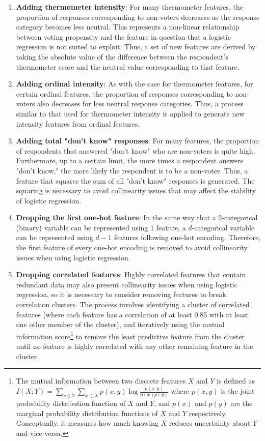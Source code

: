 \documentclass{article}
\begin{document}
	\begin{enumerate}[label=\Alph*.]
		\item {\textbf{Adding thermometer intensity}: For many thermometer features, the proportion of responses corresponding to non-voters decreases as the response category becomes less neutral. This represents a non-linear relationship between voting propensity and the feature in question that a logistic regression is not suited to exploit. Thus, a set of new features are derived by taking the absolute value of the difference between the respondent's thermometer score and the neutral value corresponding to that feature.}
		\item {\textbf{Adding ordinal intensity}}: As with the case for thermometer features, for certain ordinal features, the proportion of responses corresponding to non-voters also decreases for less neutral response categories. Thus, a process similar to that used for thermometer intensity is applied to generate new intensity features from ordinal features.
		\item {\textbf{Adding total "don't know" responses}: For many features, the proportion of respondents that answered "don't know" who are non-voters is quite high. Furthermore, up to a certain limit, the more times a respondent answers "don't know," the more likely the respondent is to be a non-voter. Thus, a feature that squares the sum of all "don't know" responses is generated. The squaring is necessary to avoid collinearity issues that may affect the stability of logistic regression.}
		\item {\textbf{Dropping the first one-hot feature}: In the same way that a 2-categorical (binary) variable can be represented using 1 feature, a $d$-categorical variable can be represented using $d-1$ features following one-hot encoding. Therefore, the first feature of every one-hot encoding is removed to avoid collinearity issues when using logistic regression.}
		\item {\textbf{Dropping correlated features}: Highly correlated features that contain redundant data may also present collinearity issues when using logistic regression, so it is necessary to consider removing features to break correlation clusters. The process involves identifying a cluster of correlated features (where each feature has a correlation of at least 0.85 with at least one other member of the cluster), and iteratively using the mutual information score\footnote{The mutual information between two discrete features $X$ and $Y$ is defined as $I(X;Y) = \sum_{y\in Y}\sum_{x \in X}p(x,y)\log{\frac{p(x,y)}{p(x)p(y)}}$ where $p(x,y)$ is the joint probability distribution function of $X$ and $Y$, and $p(x)$ and $p(y)$ are the marginal probability distribution functions of $X$ and $Y$ respectively. Conceptually, it measures how much knowing $X$ reduces uncertainty about $Y$ and vice versa.} to remove the least predictive feature from the cluster until no feature is highly correlated with any other remaining feature in the cluster.}
	\end{enumerate}
\end{document}
